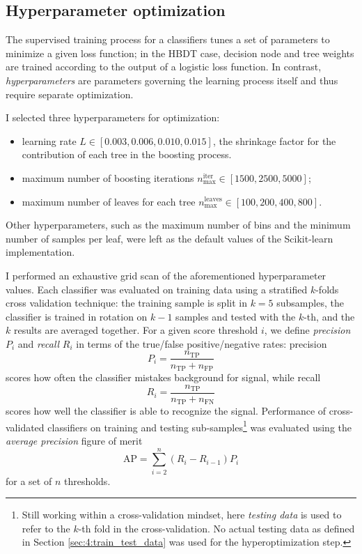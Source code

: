 \subsection{Hyperparameter optimization}
\label{sec:4:hyperoptimization}

The supervised training process for a classifiers tunes a set of parameters to minimize a given loss function; in the HBDT case, decision node and tree weights are trained according to the output of a logistic loss function.
In contrast, \textit{hyperparameters} are parameters governing the learning process itself and thus require separate optimization.

I selected three hyperparameters for optimization:
\begin{itemize}
	\item learning rate $L \in [0.003, 0.006, 0.010, 0.015]$, the shrinkage factor for the contribution of each tree in the boosting process.
	\item maximum number of boosting iterations $n_\text{max}^\text{iter} \in [1500, 2500, 5000]$;
	\item maximum number of leaves for each tree $n_\text{max}^\text{leaves} \in [100, 200, 400, 800]$.
\end{itemize}
Other hyperparameters, such as the maximum number of bins and the minimum number of samples per leaf, were left as the default values of the Scikit-learn implementation.

I performed an exhaustive grid scan of the aforementioned hyperparameter values.
Each classifier was evaluated on training data using a stratified $k$-folds cross validation technique: the training sample is split in $k=5$ subsamples, the classifier is trained in rotation on $k-1$ samples and tested with the $k$-th, and the $k$ results are averaged together.
For a given score threshold $i$, we define \textit{precision} $P_i$ and \textit{recall} $R_i$ in terms of the true/false positive/negative rates: precision 
\begin{equation}
	P_i = \frac{n_\text{TP}}{n_\text{TP} + n_\text{FP}}
	\label{eq:4:precision}
\end{equation}
scores how often the classifier mistakes background for signal, while recall
\begin{equation}
	R_i = \frac{n_\text{TP}}{n_\text{TP} + n_\text{FN}}
	\label{eq:4:recall}
\end{equation}
scores how well the classifier is able to recognize the signal.
Performance of cross-validated classifiers on training and testing sub-samples\footnote{Still working within a cross-validation mindset, here \textit{testing data} is used to refer to the $k$-th fold in the cross-validation. No actual testing data as defined in Section \ref{sec:4:train_test_data} was used for the hyperoptimization step.} was evaluated using the \textit{average precision} figure of merit
\begin{equation}
	\text{AP} = \sum_{i=2}^{n} (R_i - R_{i-1})P_i
	\label{eq:4:average_prec}
\end{equation}
for a set of $n$ thresholds.

